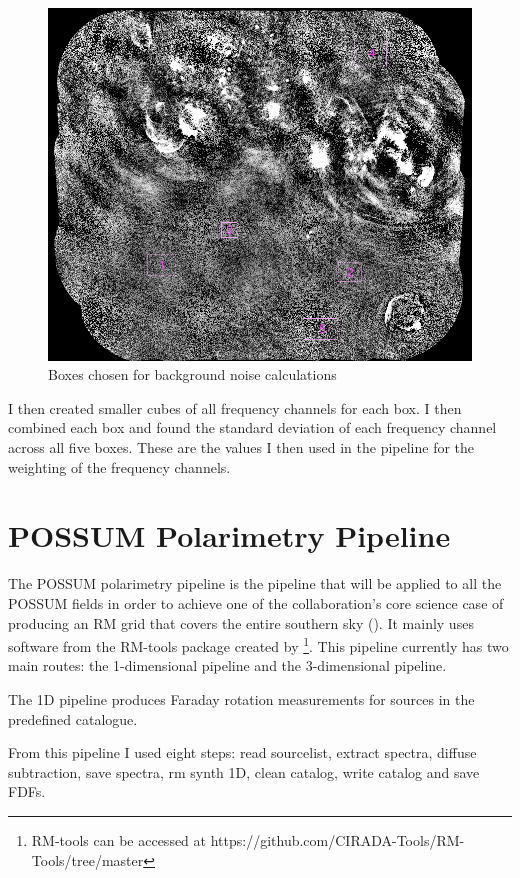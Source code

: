 \begin{figure}
    \centering
    \includegraphics[width=0.9\linewidth]{Thesis_Template/Figures/Boxes for noise calculation image.png}
    \caption{Boxes chosen for background noise calculations}
    \label{fig: background noise boxes}
\end{figure}

I then created smaller cubes of all frequency channels for each box. I then combined each box and found the standard deviation of each frequency channel across all five boxes. These are the values I then used in the pipeline for the weighting of the frequency channels.


\section{POSSUM Polarimetry Pipeline}
\label{POSSUM pipeline 1d}
The POSSUM polarimetry pipeline is the pipeline that will be applied to all the POSSUM fields in order to achieve one of the collaboration's core science case of producing an RM grid that covers the entire southern sky (\cite{POSSUM}). It mainly uses software from the RM-tools package created by \cite{RMtools} \footnote{RM-tools can be accessed at https://github.com/CIRADA-Tools/RM-Tools/tree/master}. This pipeline currently has two main routes: the 1-dimensional pipeline and the 3-dimensional pipeline. 


The 1D pipeline produces Faraday rotation measurements for sources in the predefined catalogue.

From this pipeline I used eight steps: read sourcelist, extract spectra, diffuse subtraction, save spectra, rm synth 1D, clean catalog, write catalog and save FDFs.

